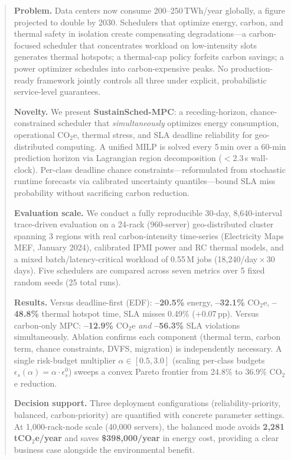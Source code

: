\documentclass[a4paper,fleqn]{cas-dc}
\begin{document}
\begin{abstract}
\textbf{Problem.}
Data centers now consume 200--250\,TWh/year globally, a figure projected to double by 2030. Schedulers that optimize energy, carbon, and thermal safety in isolation create compensating degradations---a carbon-focused scheduler that concentrates workload on low-intensity slots generates thermal hotspots; a thermal-cap policy forfeits carbon savings; a power optimizer schedules into carbon-expensive peaks. No production-ready framework jointly controls all three under explicit, probabilistic service-level guarantees.

\textbf{Novelty.}
We present \textbf{SustainSched-MPC}: a receding-horizon, chance-constrained scheduler that \emph{simultaneously} optimizes energy consumption, operational CO$_2$e, thermal stress, and SLA deadline reliability for geo-distributed computing. A unified MILP is solved every 5\,min over a 60-min prediction horizon via Lagrangian region decomposition ($<2.3$\,s wall-clock). Per-class deadline chance constraints---reformulated from stochastic runtime forecasts via calibrated uncertainty quantiles---bound SLA miss probability without sacrificing carbon reduction.

\textbf{Evaluation scale.}
We conduct a fully reproducible 30-day, 8,640-interval trace-driven evaluation on a 24-rack (960-server) geo-distributed cluster spanning 3 regions with real carbon-intensity time-series (Electricity Maps MEF, January 2024), calibrated IPMI power and RC thermal models, and a mixed batch/latency-critical workload of 0.55\,M jobs (18,240/day\,$\times$\,30 days). Five schedulers are compared across seven metrics over 5 fixed random seeds (25 total runs).

\textbf{Results.}
Versus deadline-first (EDF): \textbf{--20.5\%} energy, \textbf{--32.1\%} CO$_2$e, \textbf{--48.8\%} thermal hotspot time, SLA misses 0.49\% ($+$0.07\,pp). Versus carbon-only MPC: \textbf{--12.9\%} CO$_2$e \emph{and} \textbf{--56.3\%} SLA violations simultaneously. Ablation confirms each component (thermal term, carbon term, chance constraints, DVFS, migration) is independently necessary. A single risk-budget multiplier $\alpha \in [0.5, 3.0]$ (scaling per-class budgets $\epsilon_s(\alpha) = \alpha\cdot\epsilon_s^0$) sweeps a convex Pareto frontier from 24.8\% to 36.9\% CO$_2$e reduction.

\textbf{Decision support.}
Three deployment configurations (reliability-priority, balanced, carbon-priority) are quantified with concrete parameter settings. At 1,000-rack-node scale (40,000 servers), the balanced mode avoids \textbf{2,281\,tCO$_2$e/year} and saves \textbf{\$398,000/year} in energy cost, providing a clear business case alongside the environmental benefit.
\end{abstract}
\end{document}
